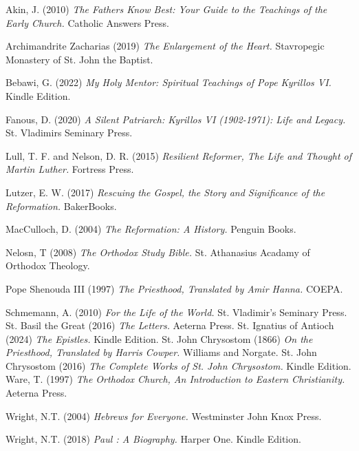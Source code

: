 \documentclass[12pt, doc]{apa7}   	%
\begin{document}
\begin{thebibliography}{15}

Akin, J. (2010) \emph{The Fathers Know Best: Your Guide to the Teachings of the Early Church.} Catholic Answers Press.
    
Archimandrite Zacharias (2019) \emph{The Enlargement of the Heart.} Stavropegic Monastery of St. John the Baptist.

Bebawi, G. (2022) \emph{My Holy Mentor: Spiritual Teachings of Pope Kyrillos VI.} Kindle Edition.

Fanous, D. (2020) \emph{A Silent Patriarch: Kyrillos VI (1902-1971): Life and Legacy.} St. Vladimirs Seminary Press.

Lull, T. F. and Nelson, D. R. (2015) \emph{Resilient Reformer, The Life and Thought of Martin Luther.} Fortress Press.

Lutzer, E. W. (2017) \emph{Rescuing the Gospel, the Story and Significance of the Reformation.} BakerBooks.

MacCulloch, D. (2004) \emph{The Reformation: A History.} Penguin Books.

Nelosn, T (2008) \emph{The Orthodox Study Bible.} St. Athanasius Acadamy of Orthodox Theology.

Pope Shenouda III (1997) \emph{The Priesthood, Translated by Amir Hanna.} COEPA. 

Schmemann, A. (2010) \emph{For the Life of the World.} St. Vladimir's Seminary Press.
St. Basil the Great (2016) \emph{The Letters.} Aeterna Press.
St. Ignatius of Antioch (2024) \emph{The Epistles.} Kindle Edition.
St. John Chrysostom  (1866) \emph{On the Priesthood, Translated by Harris Cowper.}  Williams and Norgate. 
St. John Chrysostom  (2016) \emph{The Complete Works of St. John Chrysostom.}  Kindle Edition. 
Ware, T. (1997) \emph{The Orthodox Church, An Introduction to Eastern Christianity.} Aeterna Press.

Wright, N.T. (2004) \emph{Hebrews for Everyone.} Westminster John Knox Press.


Wright, N.T. (2018) \emph{Paul : A Biography.} Harper One.  Kindle Edition.


\end{thebibliography}
\end{document}
